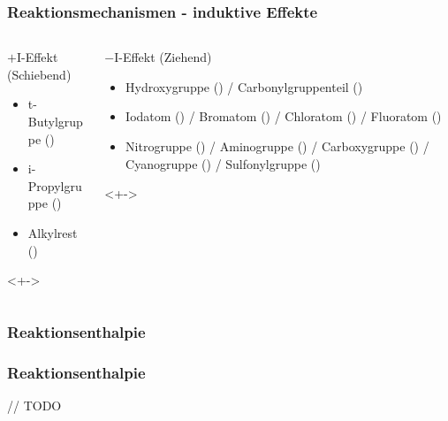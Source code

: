 \begin{frame}
\frametitle{Reaktionsmechanismen - induktive Effekte}
\begin{columns}
\begin{column}{0.48\textwidth}
\begin{block}{$+\text{I}$-Effekt (Schiebend)}
\begin{itemize}
	\item t-Butylgruppe ()
	\item i-Propylgruppe ()
	\item Alkylrest ()
\end{itemize}
\end{block}
\begin{examples}<+->
\end{examples}
\end{column}
\begin{column}{0.48\textwidth}
\begin{block}{$-\text{I}$-Effekt (Ziehend)}
\begin{itemize}
	\item Hydroxygruppe () / Carbonylgruppenteil ()
	\item Iodatom () / Bromatom () / Chloratom () / Fluoratom ()
	\item Nitrogruppe () / Aminogruppe () / Carboxygruppe () / Cyanogruppe () / Sulfonylgruppe ()
\end{itemize}
\end{block}
\begin{examples}<+->
\end{examples}
\end{column}
\end{columns}
\end{frame}
\subsubsection{Reaktionsenthalpie}
\begin{frame}
	\frametitle{Reaktionsenthalpie}
	// TODO
\end{frame}
